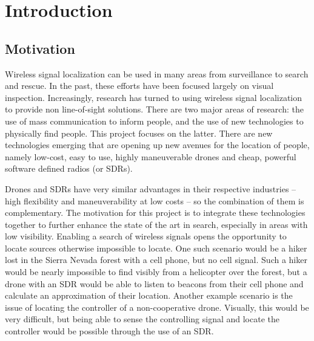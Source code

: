 \chapter{Introduction}

\section{Motivation}
Wireless signal localization can be used in many areas from surveillance to search and rescue. In the past, these efforts have been focused largely on visual inspection. Increasingly, research has turned to using wireless signal localization to provide non line-of-sight solutions. There are two major areas of research: the use of mass communication to inform people, and the use of new technologies to physically find people. This project focuses on the latter. There are new technologies emerging that are opening up new avenues for the location of people, namely low-cost, easy to use, highly maneuverable drones and cheap, powerful software defined radios (or SDRs). \par
Drones and SDRs have very similar advantages in their respective industries – high flexibility and maneuverability at low costs – so the combination of them is complementary. The motivation for this project is to integrate these technologies together to further enhance the state of the art in search, especially in areas with low visibility. Enabling a search of wireless signals opens the opportunity to locate sources otherwise impossible to locate. One such scenario would be a hiker lost in the Sierra Nevada forest with a cell phone, but no cell signal. Such a hiker would be nearly impossible to find visibly from a helicopter over the forest, but a drone with an SDR would be able to listen to beacons from their cell phone and calculate an approximation of their location. Another example scenario is the issue of locating the controller of a non-cooperative drone. Visually, this would be very difficult, but being able to sense the controlling signal and locate the controller would be possible through the use of an SDR.\par
